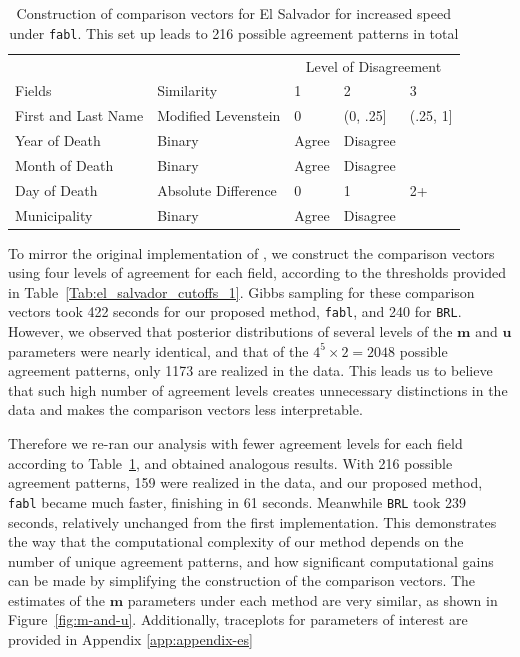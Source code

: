\documentclass[12pt,letterpaper]{article}
\newcommand{\1}[1]{\mathbb{I}\!\left[#1\right]} %
\begin{document}
\begin{table}
	\centering
	\begin{tabular}[h!]{ll|lll}
		\hline
		\multicolumn{2}{c|}{ } & \multicolumn{3}{c}{Level of Disagreement} \\
		\cline{3-5}
		Fields & Similarity & 1 & 2 & 3\\
		\hline
		First and Last Name & Modified Levenstein & 0 & (0, .25] & (.25, 1]\\
		\hline
		Year of Death & Binary & Agree & Disagree & \\
		\hline
		Month of Death & Binary & Agree & Disagree & \\
		\hline
		Day of Death & Absolute Difference & 0 & 1 & 2+\\
		\hline
		Municipality & Binary & Agree & Disagree & \\
		\hline
	\end{tabular}
\caption{Construction of comparison vectors for El Salvador for increased speed under \texttt{fabl}. This set up leads to 216 possible agreement patterns in total}\label{Tab:el_salvador_cutoffs_2}
\end{table}

To mirror the original implementation of \cite{sadinle_bayesian_2017}, we construct the comparison
vectors using four levels of agreement for each field, according to the
thresholds provided in Table~\ref{Tab:el_salvador_cutoffs_1}. Gibbs sampling for these comparison vectors took 422 seconds for our proposed
method, \texttt{fabl}, and 240 for \texttt{BRL}. However, we observed that posterior
distributions of several levels of the \(\mathbf{m}\) and \(\mathbf{u}\)
parameters were nearly identical, and that of the
\(4^5 \times 2 = 2048\) possible agreement patterns, only 1173 are
realized in the data. This leads us to believe that such high number of
agreement levels creates unnecessary distinctions in the data and makes
the comparison vectors less interpretable. 

Therefore we re-ran our analysis with fewer agreement levels for each field according to Table~\ref{Tab:el_salvador_cutoffs_2}, and
obtained analogous results. With 216 possible agreement patterns, 159
were realized in the data, and our proposed method, \texttt{fabl} became much faster,
finishing in 61 seconds. Meanwhile \texttt{BRL} took 239 seconds,
relatively unchanged from the first implementation. This demonstrates
the way that the computational complexity of our method depends on the
number of unique agreement patterns, and how significant computational
gains can be made by simplifying the construction of the comparison
vectors. The estimates of the \(\mathbf{m}\) parameters under each method are very similar, as shown in
Figure~\ref{fig:m-and-u}. Additionally, traceplots for parameters of interest are provided in Appendix \ref{app:appendix-es}
\end{document}
